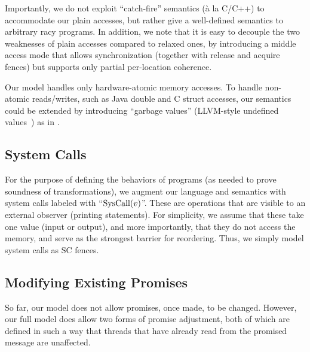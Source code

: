 Importantly, we do not exploit ``catch-fire'' semantics (\`a la C/C++) to accommodate our plain accesses,
but rather give a well-defined semantics to arbitrary racy programs.
In addition, we note that it is easy to decouple the two weaknesses of plain accesses compared to relaxed ones,
by introducing a middle access mode that allows synchronization
(together with release and acquire fences) but supports only partial per-location coherence.  

\begin{remark}
Our model handles only hardware-atomic memory accesses.
To handle non-atomic reads/writes, such as Java double and C struct accesses, our semantics could be extended 
by introducing ``garbage values'' (LLVM-style undefined values~\cite{llvm}) as in \cite{Soham17}.
\end{remark}

\subsection{System Calls}
\label{sec:sys_call}
For the purpose of  defining the behaviors of programs (as needed to prove soundness of transformations),
we augment our language and semantics with system calls labeled with ``${\text{SysCall}(v)}$''.
These are operations that  are visible to an external observer (\eg printing statements). 
For simplicity, we assume that these take one value (input or output),
and more importantly, that they do not access the memory, and serve as the strongest barrier for reordering.
Thus, we simply model system calls as SC fences.

\subsection{Modifying Existing Promises}

So far, our model does not allow promises, once made, to be changed.
However, our full model does allow two forms of promise adjustment,
both of which are defined in such a way that threads that have already
read from the promised message are unaffected.


